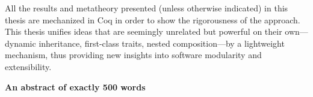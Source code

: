 All the results and metatheory presented (unless otherwise indicated) in this
thesis are mechanized in Coq in order to show the rigorousness of the approach.
This thesis unifies ideas that are seemingly unrelated but powerful on their
own---dynamic inheritance, first-class traits, nested composition---by a
lightweight mechanism, thus providing new insights into software modularity and
extensibility.

\vspace{1.5\baselineskip}

\noindent\makebox[\linewidth]{\rule{0.7\textwidth}{0.4pt}}

\begin{center}
\textbf{An abstract of exactly 500 words}
\end{center}